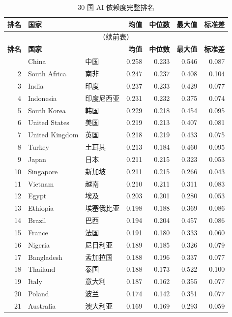 \documentclass[11pt,a4paper]{article}
\begin{document}
\begin{longtable}{rllrrrr}
\caption{30 国 AI 依赖度完整排名} \\
\toprule
\textbf{排名} & \textbf{国家} & & \textbf{均值} & \textbf{中位数} & \textbf{最大值} & \textbf{标准差} \\
\midrule
\endfirsthead
\multicolumn{7}{c}{（续前表）} \\
\toprule
\textbf{排名} & \textbf{国家} & & \textbf{均值} & \textbf{中位数} & \textbf{最大值} & \textbf{标准差} \\
\midrule
\endhead
\bottomrule
\endfoot
1 & China & 中国 & 0.258 & 0.233 & 0.546 & 0.087 \\
2 & South Africa & 南非 & 0.247 & 0.237 & 0.408 & 0.104 \\
3 & India & 印度 & 0.237 & 0.233 & 0.429 & 0.077 \\
4 & Indonesia & 印度尼西亚 & 0.231 & 0.232 & 0.375 & 0.074 \\
5 & South Korea & 韩国 & 0.229 & 0.218 & 0.454 & 0.095 \\
6 & United States & 美国 & 0.219 & 0.213 & 0.407 & 0.081 \\
7 & United Kingdom & 英国 & 0.218 & 0.219 & 0.433 & 0.075 \\
8 & Turkey & 土耳其 & 0.213 & 0.184 & 0.460 & 0.095 \\
9 & Japan & 日本 & 0.211 & 0.215 & 0.323 & 0.053 \\
10 & Singapore & 新加坡 & 0.211 & 0.215 & 0.266 & 0.043 \\
11 & Vietnam & 越南 & 0.210 & 0.211 & 0.311 & 0.083 \\
12 & Egypt & 埃及 & 0.203 & 0.201 & 0.280 & 0.053 \\
13 & Ethiopia & 埃塞俄比亚 & 0.198 & 0.188 & 0.369 & 0.086 \\
14 & Brazil & 巴西 & 0.194 & 0.204 & 0.457 & 0.086 \\
15 & France & 法国 & 0.191 & 0.180 & 0.333 & 0.060 \\
16 & Nigeria & 尼日利亚 & 0.189 & 0.185 & 0.326 & 0.079 \\
17 & Bangladesh & 孟加拉国 & 0.188 & 0.196 & 0.337 & 0.077 \\
18 & Thailand & 泰国 & 0.188 & 0.173 & 0.522 & 0.100 \\
19 & Italy & 意大利 & 0.187 & 0.162 & 0.355 & 0.077 \\
20 & Poland & 波兰 & 0.174 & 0.142 & 0.351 & 0.077 \\
21 & Australia & 澳大利亚 & 0.169 & 0.169 & 0.293 & 0.059 \\

\end{longtable}
\end{document}
